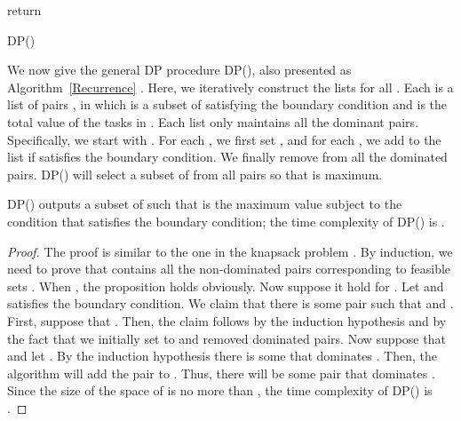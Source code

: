 \documentclass[10pt,journal,compsoc]{IEEEtran}
\begin{document}
\begin{algorithm}
\BlankLine
\BlankLine

\;

\;

return \;
\caption{DP()\label{Recurrence}}
\end{algorithm}





We now give the general DP procedure DP(), also presented as Algorithm~\ref{Recurrence} \cite{Williamson}. Here, we iteratively construct the lists  for all . Each  is a list of pairs , in which  is a subset of  satisfying the boundary condition and  is the total value of the tasks in . Each list only maintains all the dominant pairs. Specifically, we start with . For each , we first set , and for each , we add  to the list  if  satisfies the boundary condition. We finally remove from  all the dominated pairs.
DP() will select a subset  of  from all pairs  so that  is maximum.








\begin{proposition}\label{selection}
DP() outputs a subset  of   such that  is the maximum value subject to the condition that  satisfies the boundary condition; the time complexity of DP() is .
\end{proposition}
\begin{proof}
The proof is similar to the one in the knapsack problem \cite{Williamson}. By induction, we need to prove that  contains all the non-dominated pairs corresponding to feasible sets . When , the proposition holds obviously. Now suppose it hold for . Let  and  satisfies the boundary condition. We claim that there is some pair  such that  and . First, suppose that . Then, the claim follows by the induction hypothesis and by the fact that we initially set  to  and removed dominated pairs. Now suppose that  and let .  By the induction hypothesis there is some  that dominates . Then, the algorithm will add the pair  to . Thus, there will be some pair  that dominates . Since the size of the space of  is no more than , the time complexity of DP() is . \end{proof}
\end{document}
